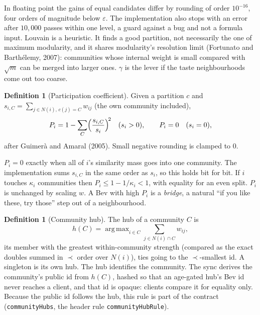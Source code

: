 \documentclass[11pt]{article}
\DeclareMathOperator*{\argmax}{arg\,max}
\newcommand{\code}[1]{\texttt{#1}}
\theoremstyle{plain}
\theoremstyle{definition}
\newtheorem{definition}[theorem]{Definition}
\theoremstyle{remark}
\begin{document}
In floating point the gains of equal candidates differ by rounding of order $10^{-16}$, four orders of magnitude below $\varepsilon$. The implementation also stops with an error after $10{,}000$ passes within one level, a guard against a bug and not a formula input. Louvain is a heuristic. It finds a good partition, not necessarily the one of maximum modularity, and it shares modularity's resolution limit (Fortunato and Barth\'elemy, 2007): communities whose internal weight is small compared with $\sqrt{m}$ can be merged into larger ones. $\gamma$ is the lever if the taste neighbourhoods come out too coarse.

\begin{definition}[Participation coefficient]\label{def:participation}
Given a partition $c$ and $s_{i,C} = \sum_{j \in N(i),\, c(j) = C} w_{ij}$ (the own community included),
\begin{equation}\label{eq:participation}
P_i = 1 - \sum_C \Bigl( \frac{s_{i,C}}{s_i} \Bigr)^{\!2} \quad (s_i > 0), \qquad P_i = 0 \quad (s_i = 0),
\end{equation}
after Guimer\`a and Amaral (2005). Small negative rounding is clamped to $0$.
\end{definition}

$P_i = 0$ exactly when all of $i$'s similarity mass goes into one community. The implementation sums $s_{i,C}$ in the same order as $s_i$, so this holds bit for bit. If $i$ touches $\kappa_i$ communities then $P_i \le 1 - 1/\kappa_i < 1$, with equality for an even split. $P_i$ is unchanged by scaling $w$. A Bev with high $P_i$ is a \emph{bridge}, a natural ``if you like these, try those'' step out of a neighbourhood.

\begin{definition}[Community hub]\label{def:hub}
The hub of a community $C$ is
\[
h(C) = \argmax_{i \in C} \sum_{j \in N(i) \cap C} w_{ij},
\]
its member with the greatest within-community strength (compared as the exact doubles summed in $\prec$ order over $N(i)$), ties going to the $\prec$-smallest id. A singleton is its own hub. The hub identifies the community. The sync derives the community's public id from $h(C)$, hashed so that an age-gated hub's Bev id never reaches a client, and that id is opaque: clients compare it for equality only. Because the public id follows the hub, this rule is part of the contract (\code{communityHubs}, the header rule \code{communityHubRule}).
\end{definition}
\end{document}
